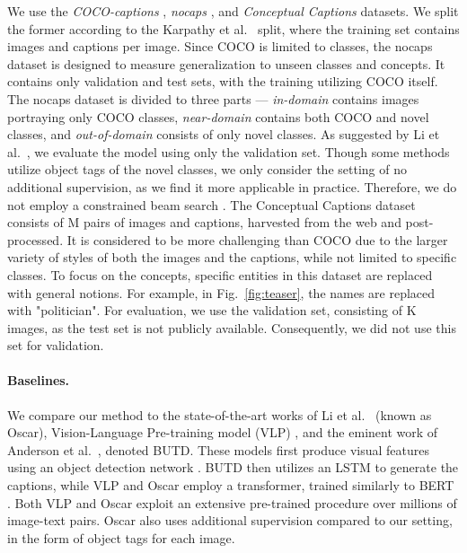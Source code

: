 We use the \textit{COCO-captions} \cite{lin2014microsoft, chen2015microsoft}, \textit{nocaps} \cite{agrawal2019nocaps} , and \textit{Conceptual Captions} \cite{sharma2018conceptual} datasets. We split the former according to the Karpathy et al.~\cite{karpathy2015deep} split, where the training set contains  images and  captions per image. Since COCO is limited to  classes, the nocaps dataset is designed to measure generalization to unseen classes and concepts. It contains only validation and test sets, with the training utilizing COCO itself. The nocaps dataset is divided to three parts --- \textit{in-domain} contains images portraying only COCO classes, \textit{near-domain} contains both COCO and novel classes, and \textit{out-of-domain} consists of only novel classes. As suggested by Li et al.~\cite{li2020oscar}, we evaluate the model using only the validation set. Though some methods utilize object tags of the novel classes, we only consider the setting of no additional supervision, as we find it more applicable in practice. Therefore, we do not employ a constrained beam search \cite{anderson2016guided}.
The Conceptual Captions dataset consists of M pairs of images and captions, harvested from the web and post-processed. It is considered to be more challenging than COCO due to the larger variety of styles of both the images and the captions, while not limited to specific classes. To focus on the concepts, specific entities in this dataset are replaced with general notions. For example, in Fig.~\ref{fig:teaser}, the names are replaced with "politician". For evaluation, we use the validation set, consisting of K images, as the test set is not publicly available. Consequently, we did not use this set for validation. 





\paragraph{Baselines.}
We compare our method to the state-of-the-art works of Li et al.~\cite{li2020oscar} (known as Oscar), Vision-Language Pre-training model (VLP) \cite{zhou2020unified}, and the eminent work of Anderson et al.~\cite{anderson2018bottom}, denoted BUTD. 
These models first produce visual features using an object detection network \cite{ren2015faster}. BUTD then utilizes an LSTM to generate the captions, while VLP and Oscar employ a transformer, trained similarly to BERT \cite{devlin2018bert}. Both VLP and Oscar exploit an extensive pre-trained procedure over millions of image-text pairs.
Oscar \cite{li2020oscar} also uses additional supervision compared to our setting, in the form of object tags for each image.


